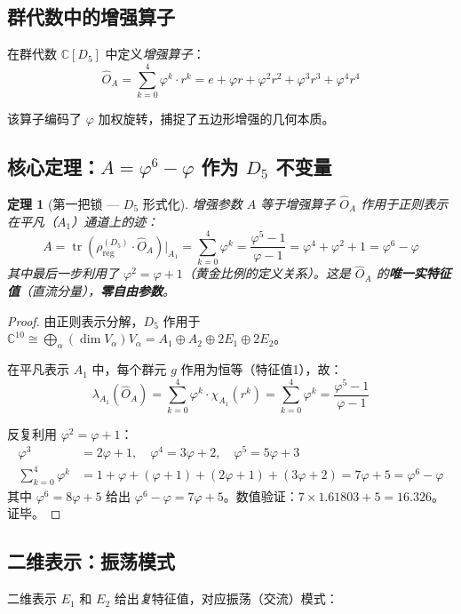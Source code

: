 \documentclass[12pt,a4paper,twocolumn]{article}
\renewcommand{\phi}{\varphi}
\newtheorem{theorem}{定理}[section]
\begin{document}
\subsection{群代数中的增强算子}
在群代数 $\mathbb{C}[D_5]$ 中定义\emph{增强算子}：
\[
\hat{O}_A = \sum_{k=0}^{4} \phi^k \cdot r^k = e + \phi r + \phi^2 r^2 + \phi^3 r^3 + \phi^4 r^4
\]

该算子编码了 $\phi$ 加权旋转，捕捉了五边形增强的几何本质。

\subsection{核心定理：$A = \phi^6 - \phi$ 作为 $D_5$ 不变量}

\begin{theorem}[第一把锁 --- $D_5$ 形式化]
\label{thm:d5_A_cn}
增强参数 $A$ 等于增强算子 $\hat{O}_A$ 作用于正则表示在平凡（$A_1$）通道上的迹：
\[
A = \operatorname{tr}\!\left(\rho_{\mathrm{reg}}^{(D_5)} \cdot \hat{O}_A\right) \Big|_{A_1} = \sum_{k=0}^{4} \phi^k = \frac{\phi^5 - 1}{\phi - 1} = \phi^4 + \phi^2 + 1 = \phi^6 - \phi
\]
其中最后一步利用了 $\phi^2 = \phi + 1$（黄金比例的定义关系）。这是 $\hat{O}_A$ 的\textbf{唯一实特征值}（直流分量），\textbf{零自由参数}。
\end{theorem}

\begin{proof}
由正则表示分解，$D_5$ 作用于 $\mathbb{C}^{10} \cong \bigoplus_\alpha (\dim V_\alpha) V_\alpha = A_1 \oplus A_2 \oplus 2E_1 \oplus 2E_2$。

在平凡表示 $A_1$ 中，每个群元 $g$ 作用为恒等（特征值1），故：
\[
\lambda_{A_1}(\hat{O}_A) = \sum_{k=0}^{4} \phi^k \cdot \chi_{A_1}(r^k) = \sum_{k=0}^{4} \phi^k = \frac{\phi^5 - 1}{\phi - 1}
\]

反复利用 $\phi^2 = \phi + 1$：
\begin{align*}
\phi^3 &= 2\phi + 1, \quad \phi^4 = 3\phi + 2, \quad \phi^5 = 5\phi + 3 \\
\sum_{k=0}^{4} \phi^k &= 1 + \phi + (\phi+1) + (2\phi+1) + (3\phi+2) = 7\phi + 5 = \phi^6 - \phi
\end{align*}
其中 $\phi^6 = 8\phi + 5$ 给出 $\phi^6 - \phi = 7\phi + 5$。数值验证：$7 \times 1.61803 + 5 = 16.326$。证毕。
\end{proof}

\subsection{二维表示：振荡模式}
二维表示 $E_1$ 和 $E_2$ 给出\emph{复}特征值，对应振荡（交流）模式：
\end{document}
